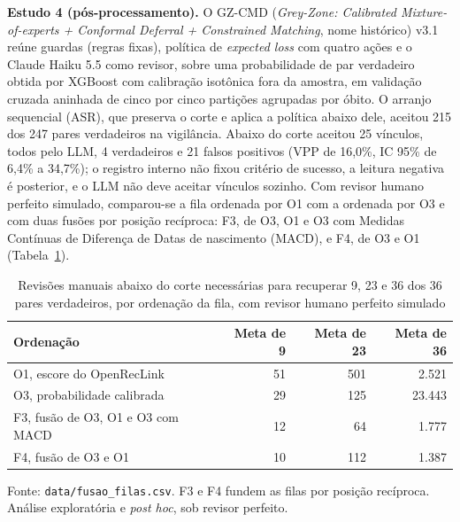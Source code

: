 \documentclass[12pt,a4paper]{article}
\begin{document}
\textbf{Estudo 4 (pós-processamento).} O GZ-CMD (\textit{Grey-Zone: Calibrated Mixture-of-experts + Conformal Deferral + Constrained Matching}, nome histórico) v3.1 reúne guardas (regras fixas), política de \textit{expected loss} com quatro ações e o Claude Haiku 5.5 como revisor, sobre uma probabilidade de par verdadeiro obtida por XGBoost com calibração isotônica fora da amostra, em validação cruzada aninhada de cinco por cinco partições agrupadas por óbito. %
O arranjo sequencial (ASR), que preserva o corte e aplica a política abaixo dele, aceitou 215 dos 247 pares verdadeiros na vigilância. %
Abaixo do corte aceitou 25 vínculos, todos pelo LLM, 4 verdadeiros e 21 falsos positivos (VPP de 16,0\%, IC 95\% de 6,4\% a 34,7\%); o registro interno não fixou critério de sucesso, a leitura negativa é posterior, e o LLM não deve aceitar vínculos sozinho. %
Com revisor humano perfeito simulado, comparou-se a fila ordenada por O1 com a ordenada por O3 e com duas fusões por posição recíproca: F3, de O3, O1 e O3 com Medidas Contínuas de Diferença de Datas de nascimento (MACD), e F4, de O3 e O1 (Tabela~\ref{tab:revisoes}). %

\begin{table}[!htbp]
\centering
\small
\begin{singlespacing}
\caption{Revisões manuais abaixo do corte necessárias para recuperar 9, 23 e 36 dos 36 pares verdadeiros, por ordenação da fila, com revisor humano perfeito simulado}
\label{tab:revisoes}
\begin{tabular}{lrrr}
\toprule
Ordenação & Meta de 9 & Meta de 23 & Meta de 36 \\
\midrule
O1, escore do OpenRecLink & 51 & 501 & 2.521 \\ %
O3, probabilidade calibrada & 29 & 125 & 23.443 \\ %
F3, fusão de O3, O1 e O3 com MACD & 12 & 64 & 1.777 \\ %
F4, fusão de O3 e O1 & 10 & 112 & 1.387 \\ %
\bottomrule
\end{tabular}
\par\smallskip
\begin{minipage}{0.95\textwidth}
\footnotesize Fonte: \texttt{data/fusao\_filas.csv}. F3 e F4 fundem as filas por posição recíproca. Análise exploratória e \textit{post hoc}, sob revisor perfeito.
\end{minipage}
\end{singlespacing}
\end{table}
\end{document}
